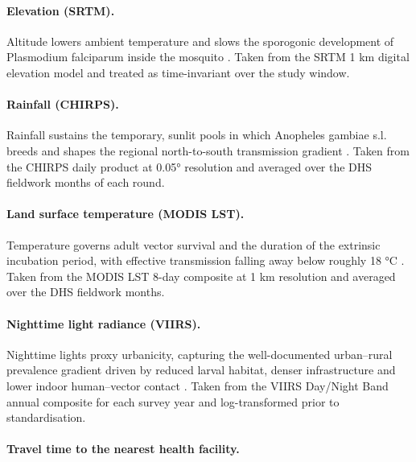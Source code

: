 \documentclass{article}
\begin{document}
\paragraph{Elevation (SRTM).}

Altitude lowers ambient temperature and slows the sporogonic development
of Plasmodium falciparum inside the mosquito
\citep{gething2011modelling, bhatt2015}. Taken from the SRTM 1 km
digital elevation model and treated as time-invariant over the study
window.

\paragraph{Rainfall (CHIRPS).}

Rainfall sustains the temporary, sunlit pools in which Anopheles gambiae
s.l. breeds and shapes the regional north-to-south transmission gradient
\citep{sinka2010dominant, bhatt2015}. Taken from the CHIRPS daily
product at 0.05° resolution \citep{funk2015} and averaged over the DHS
fieldwork months of each round.

\paragraph{Land surface temperature (MODIS LST).}

Temperature governs adult vector survival and the duration of the
extrinsic incubation period, with effective transmission falling away
below roughly 18 °C \citep{gething2011modelling}. Taken from the MODIS
LST 8-day composite at 1 km resolution and averaged over the DHS
fieldwork months.

\paragraph{Nighttime light radiance (VIIRS).}

Nighttime lights proxy urbanicity, capturing the well-documented
urban--rural prevalence gradient driven by reduced larval habitat,
denser infrastructure and lower indoor human--vector contact
\citep{hay2005urbanization, tusting2019mapping}. Taken from the VIIRS
Day/Night Band annual composite \citep{elvidge2021} for each survey year
and log-transformed prior to standardisation.

\paragraph{Travel time to the nearest health facility.}
\end{document}

